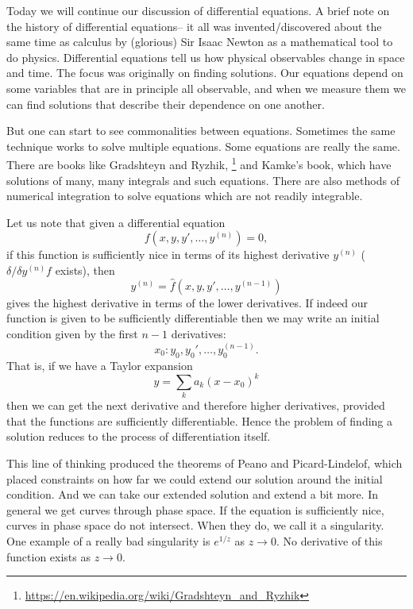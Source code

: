 Today we will continue our discussion of differential equations. A brief note on the history of differential equations-- it all was invented/discovered about the same time as calculus by (glorious) Sir Isaac Newton as a mathematical tool to do physics.
Differential equations tell us how physical observables change in space and time. The focus was originally on finding solutions. Our equations depend on some variables that are in principle all observable, and when we measure them we can find solutions that describe their dependence on one another.

But one can start to see commonalities between equations. Sometimes the same technique works to solve multiple equations. Some equations are really the same. There are books like Gradshteyn and Ryzhik,%
    \footnote{\url{https://en.wikipedia.org/wiki/Gradshteyn_and_Ryzhik}}
and Kamke's book, which have solutions of many, many integrals and such equations. There are also methods of numerical integration to solve equations which are not readily integrable.

Let us note that given a differential equation
\begin{equation}
    f(x,y,y',\ldots, y^{(n)})=0,
\end{equation}
if this function is sufficiently nice in terms of its highest derivative $y^{(n)}$ ($\delta/\delta y^{(n)} f$ exists), then
\begin{equation}
    y^{(n)} =\hat f(x,y, y', \ldots, y^{(n-1)})
\end{equation}
gives the highest derivative in terms of the lower derivatives. If indeed our function is given to be sufficiently differentiable then we may write an initial condition given by the first $n-1$ derivatives:
\begin{equation}
    x_0: y_0, y_0', \ldots, y_0^{(n-1)}.
\end{equation}
That is, if we have a Taylor expansion
\begin{equation}
    y= \sum_k a_k(x-x_0)^k
\end{equation}
then we can get the next derivative and therefore higher derivatives, provided that the functions are sufficiently differentiable. Hence the problem of finding a solution reduces to the process of differentiation itself.

This line of thinking produced the theorems of Peano and Picard-Lindelof, which placed constraints on how far we could extend our solution around the initial condition. And we can take our extended solution and extend a bit more. In general we get curves through phase space. If the equation is sufficiently nice, curves in phase space do not intersect. When they do, we call it a singularity. One example of a really bad singularity is $e^{1/z}$ as $z\to 0$. No derivative of this function exists as $z\to 0$.

